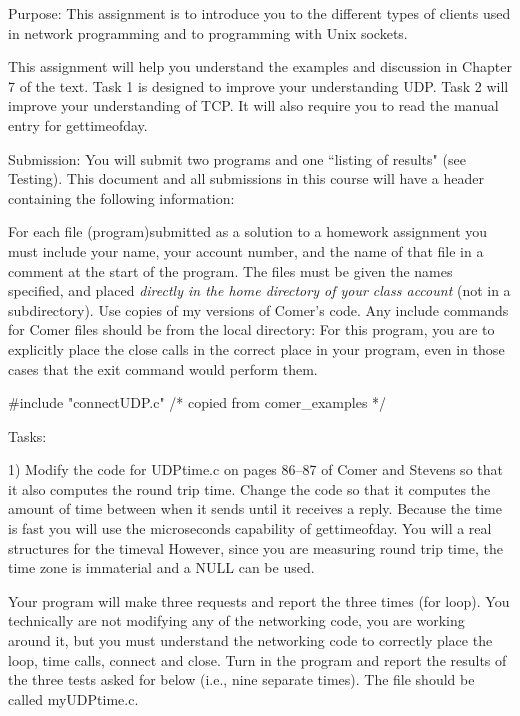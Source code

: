 

\parindent 0pt

Purpose: This assignment is to introduce you to the different types of clients
used in network programming and to programming with Unix sockets.

This assignment will help you understand the examples and discussion
in Chapter 7 of the text. 
Task 1 is designed to improve your understanding UDP.
Task 2 will improve your understanding of TCP.
It will also require you to read the manual entry
for {\ltt{}gettimeofday}.

Submission: You will submit two programs and one ``listing of results"
(see Testing).
This document and all submissions in this course will have a header
containing the following information:

For each file (program)submitted as a solution to a homework assignment you 
must include your name, your account number, and the name of that file in
a comment at the start of the program.
The files must be given the names specified, and placed
{\it directly in the home directory of your class account}
(not in a subdirectory).
Use copies of my versions of Comer's code.
Any include commands for Comer files should be from the local directory:
For this program, you are to explicitly place the close calls in
the correct place in your program, 
even in those cases that the exit command would perform them.

{\ltt{}#include "connectUDP.c"  /* copied from comer_examples */}

Tasks:

1) Modify the code for {\ltt{}UDPtime.c} on pages 86--87 of Comer and Stevens
so that it also computes the round trip time.
Change the code so that it computes the amount of time between when it sends
until it receives a reply.
Because the time is fast you will use the microseconds capability of 
{\ltt{}gettimeofday}.
You will a real structures for the {\ltt{}timeval}
However, since you are measuring round trip time, the time zone is
immaterial and a {\ltt{}NULL} can be used.

Your program will make three requests and report the three times
(for loop).
You technically are not modifying any of the networking code, 
you are working around it,
but you must understand the networking code to correctly place the
loop, time calls, connect and close.
Turn in the program and report the results of the three tests asked for 
below (i.e., nine separate times).
The file should be called {\ltt{}myUDPtime.c}.

